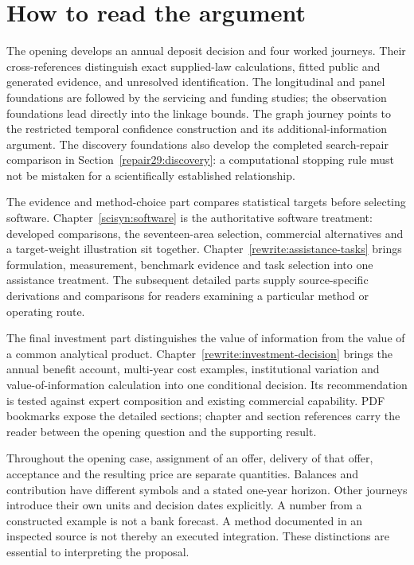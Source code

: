\chapter*{How to read the argument}

The opening develops an annual deposit decision and four worked journeys.
Their cross-references distinguish exact supplied-law calculations, fitted
public and generated evidence, and unresolved identification. The longitudinal
and panel foundations are followed by the servicing and funding studies;
the observation foundations lead directly into the linkage bounds. The graph
journey points to the restricted temporal confidence construction and its
additional-information argument. The discovery foundations also develop the
completed search-repair comparison in Section~\ref{repair29:discovery}: a
computational stopping rule must not be mistaken for a scientifically
established relationship.

The evidence and method-choice part compares statistical targets before
selecting software. Chapter~\ref{scisyn:software} is the authoritative
software treatment: developed comparisons, the seventeen-area selection,
commercial alternatives and a target-weight illustration sit together.
Chapter~\ref{rewrite:assistance-tasks} brings formulation, measurement,
benchmark evidence and task selection into one assistance treatment.
The subsequent detailed parts supply source-specific derivations and
comparisons for readers examining a particular method or operating route.

The final investment part distinguishes the value of information from the
value of a common analytical product. Chapter~\ref{rewrite:investment-decision}
brings the annual benefit account, multi-year cost examples, institutional
variation and value-of-information calculation into one conditional decision.
Its recommendation is tested against expert composition and existing
commercial capability. PDF bookmarks expose the detailed sections; chapter
and section references carry the reader between the opening question and
the supporting result.

Throughout the opening case, assignment of an offer, delivery of that offer,
acceptance and the resulting price are separate quantities. Balances and
contribution have different symbols and a stated one-year horizon. Other
journeys introduce their own units and decision dates explicitly. A number
from a constructed example is not a bank forecast. A method documented in an
inspected source is not thereby an executed integration. These distinctions
are essential to interpreting the proposal.

